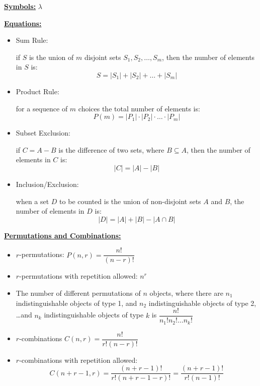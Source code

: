 \documentclass[11pt]{article}
\begin{document}
\underline{\bf Symbols:} $\lambda$
\bigskip

\underline{\bf Equations:}
\begin{itemize}
    \item Sum Rule: 
    
    if $S$ is the union of $m$ disjoint sets $S_1, S_2, \dots, S_m$, then the number of elements in $S$ is: 
$$ S = |S_1| + |S_2| + \dots + |S_m| $$
    \item Product Rule: 
    
    for a sequence of $m$ choices the total number of elements is: 
$$ P(m) = |P_1|\cdot |P_2| \cdot \dots \cdot |P_m| $$
    \item Subset Exclusion: 
    
    if $C = A - B$ is the difference of two sets, where $B \subseteq A$, then the number of elements in $C$ is:
$$ |C| = |A| - |B| $$
    \item Inclusion/Exclusion: 
    
    when a set $D$ to be counted is the union of non-disjoint sets $A$ and $B$, the number of elements in $D$ is:
$$ |D| = |A| + |B| - |A\cap B| $$
\end{itemize}
\bigskip

\underline{\bf Permutations and Combinations:}
\begin{itemize}
    \item $r$-permutations: $P(n,r) = \dfrac{n!}{(n-r)!}$
    \item $r$-permutations with repetition allowed: $n^r$
    \item The number of different permutations of $n$ objects, where there are $n_1$
indistinguishable objects of type 1, and $n_2$ indistinguishable objects
of type 2, \dots and $n_k$ indistinguishable objects of type $k$ is $\dfrac{n!}{n_1! n_2! \dots n_k!}$
    \item $r$-combinations $C(n,r) = \dfrac{n!}{r!(n-r)!}$
    \item $r$-combinations with repetition allowed: 
    $$C(n+r-1,r) = \dfrac{(n+r-1)!}{r!(n+r-1-r)!} = \dfrac{(n+r-1)!}{r!(n-1)!}$$
\end{itemize}
\end{document}
